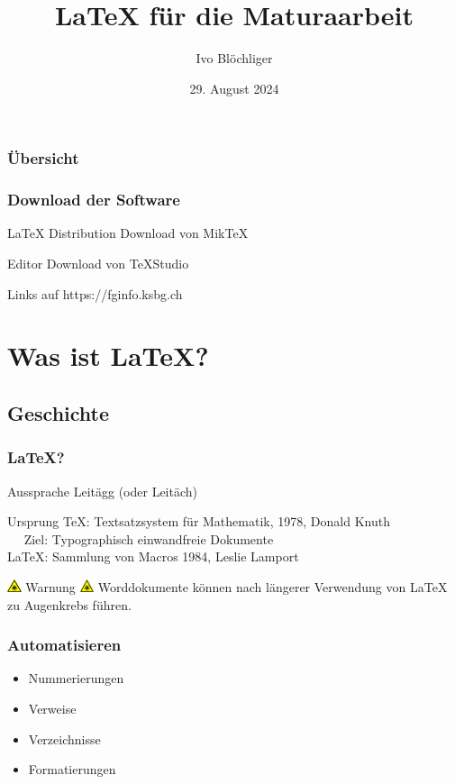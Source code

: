 \documentclass{beamer}
\title{\LaTeX{} für die Maturaarbeit}
\author{Ivo Blöchliger}
\institute{Kantonsschule am Burggraben}
\date{29. August 2024}
\begin{document}
\frame{\titlepage}

\begin{frame}
\frametitle{Übersicht}
\tableofcontents
\end{frame}

\begin{frame}
	\frametitle{Download der Software}
	\begin{block}{\LaTeX{} Distribution}
		Download von Mik\TeX
	\end{block}
	\begin{block}{Editor}
		Download von \TeX{}Studio
	\end{block}
	Links auf https://fginfo.ksbg.ch
\end{frame}

\section{Was ist \LaTeX{}?}
\subsection{Geschichte}
\begin{frame}
	\frametitle{\LaTeX{}?}
	\begin{block}{Aussprache}
		Leitägg (oder Leitäch)
	\end{block}
	\begin{block}{Ursprung}
		\TeX{}: Textsatzsystem für Mathematik, 
		1978, Donald Knuth \\ 
		$\quad$ Ziel: Typographisch einwandfreie Dokumente\\[2mm]
		\LaTeX{}: Sammlung von Macros
		1984, Leslie Lamport
	\end{block}
	\begin{alertblock}{\includegraphics[height=1em]{images/Laser-symbol.pdf}
		Warnung \includegraphics[height=1em]{images/Laser-symbol.pdf}}
		Worddokumente können nach längerer Verwendung von \LaTeX{} zu Augenkrebs
		führen.
	\end{alertblock}
\end{frame}





\begin{frame}
	\frametitle{Automatisieren}
	\begin{itemize}
		\item Nummerierungen
		\item Verweise
		\item Verzeichnisse
		\item Formatierungen
	\end{itemize}
\end{frame}
\end{document}
